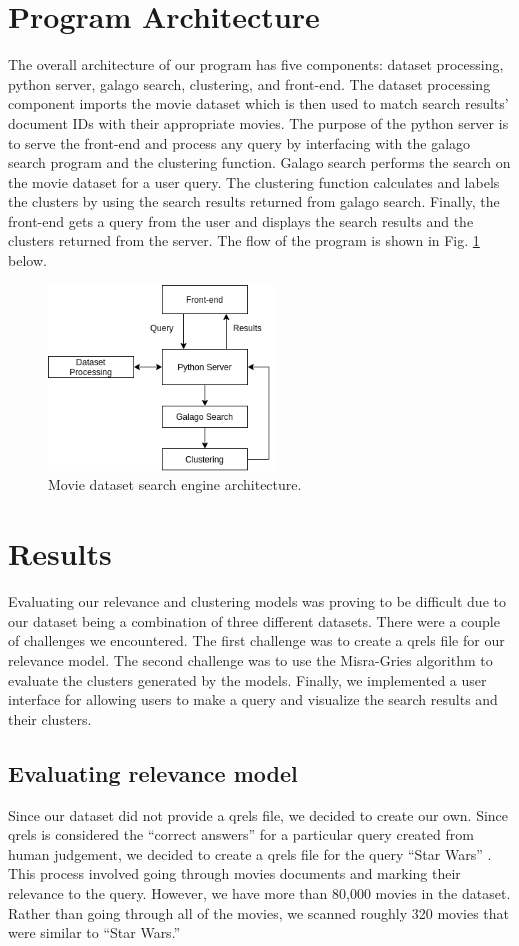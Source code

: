 \documentclass[sigconf]{acmart}
\begin{document}
\section{Program Architecture}
The overall architecture of our program has five components: dataset processing, python server, galago search, clustering, and front-end. The dataset processing component imports the movie dataset which is then used to match search results' document IDs with their appropriate movies. The purpose of the python server is to serve the front-end and process any query by interfacing with the galago search program and the clustering function. Galago search performs the search on the movie dataset for a user query. The clustering function calculates and labels the clusters by using the search results returned from galago search. Finally, the front-end gets a query from the user and displays the search results and the clusters returned from the server. The flow of the program is shown in Fig. \ref{fig:arch} below.

\begin{figure}[h]
  \centering
  \includegraphics[width=6cm]{images/image2.png}
  \caption{Movie dataset search engine architecture.}
  \label{fig:arch}
\end{figure}

\section{Results}
Evaluating our relevance and clustering models was proving to be difficult due to our dataset being a combination of three different datasets. There were a couple of challenges we encountered. The first challenge was to create a qrels file for our relevance model. The second challenge was to use the Misra-Gries algorithm to evaluate the clusters generated by the models. Finally, we implemented a user interface for allowing users to make a query and visualize the search results and their clusters.

\subsection{Evaluating relevance model}
Since our dataset did not provide a qrels file, we decided to create our own. Since qrels is considered the ``correct answers'' for a particular query created from human judgement, we decided to create a qrels file for the query ``Star Wars'' \cite{qrels}. This process involved going through movies documents and marking their relevance to the query. However, we have more than 80,000 movies in the dataset. Rather than going through all of the movies, we scanned roughly 320 movies that were similar to ``Star Wars.''
\end{document}
